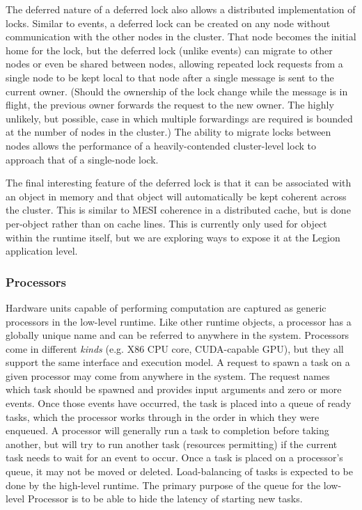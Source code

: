 The deferred nature of a deferred lock also allows a distributed implementation
of locks.  Similar to events, a deferred lock can be created on any node
without communication with the other nodes in the cluster.  That node becomes
the initial home for the lock, but the deferred lock (unlike events) can 
migrate to other nodes or even be shared between nodes, allowing repeated
lock requests from a single node to be kept local to that node after a single
message is sent to the current owner.  (Should the ownership of the lock change
while the message is in flight, the previous owner forwards the request to
the new owner.  The highly unlikely, but possible, case in which multiple 
forwardings are required is bounded at the number of nodes in the cluster.)
The ability to migrate locks between nodes allows the performance of a
heavily-contended cluster-level lock to approach that of a single-node lock.

The final interesting feature of the deferred lock is that it can be associated
with an object in memory and that object will automatically be kept coherent
across the cluster.  This is similar to MESI coherence in a distributed cache,
but is done per-object rather than on cache lines.  This is currently only 
used for object within the runtime itself, but we are exploring ways to expose
it at the Legion application level.

\subsubsection{Processors}
\label{subsec:processors}
Hardware units capable of performing computation are captured as generic
processors in the low-level runtime.  Like other runtime objects, a processor
has a globally unique name and can be referred to anywhere in the system.
Processors come in different \emph{kinds} (e.g. X86 CPU core, CUDA-capable GPU),
but they all support the same
interface and execution model.  A request to spawn a task on a given processor
may come from anywhere in the system.  The request names which task should
be spawned and provides input arguments and zero or more events.  Once those
events have occurred, the task is placed into a queue of ready tasks, which
the processor works through in the order in which they were enqueued.  A
processor will generally run a task to completion before taking another, but
will try to run another task (resources permitting) if the current task needs
to wait for an event to occur.  Once a task is placed on a processor's queue,
it may not be moved or deleted.  Load-balancing of tasks is expected to be done
by the high-level runtime.  The primary purpose of the queue for the low-level
Processor is to be able to hide the latency of starting new tasks.

